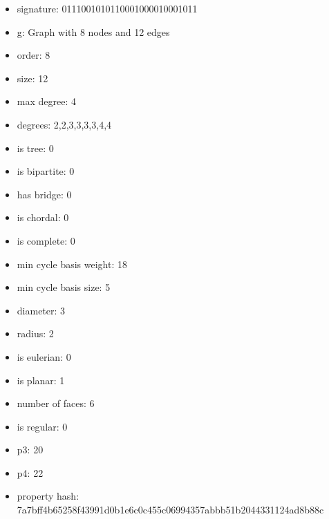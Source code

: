 \begin{itemize}
\item signature: 0111001010110001000010001011
\item g: Graph with 8 nodes and 12 edges
\item order: 8
\item size: 12
\item max degree: 4
\item degrees: 2,2,3,3,3,3,4,4
\item is tree: 0
\item is bipartite: 0
\item has bridge: 0
\item is chordal: 0
\item is complete: 0
\item min cycle basis weight: 18
\item min cycle basis size: 5
\item diameter: 3
\item radius: 2
\item is eulerian: 0
\item is planar: 1
\item number of faces: 6
\item is regular: 0
\item p3: 20
\item p4: 22
\item property hash: 7a7bff4b65258f43991d0b1e6c0c455c06994357abbb51b2044331124ad8b88c
\end{itemize}
\newpage
\begin{figure}
\end{figure}
